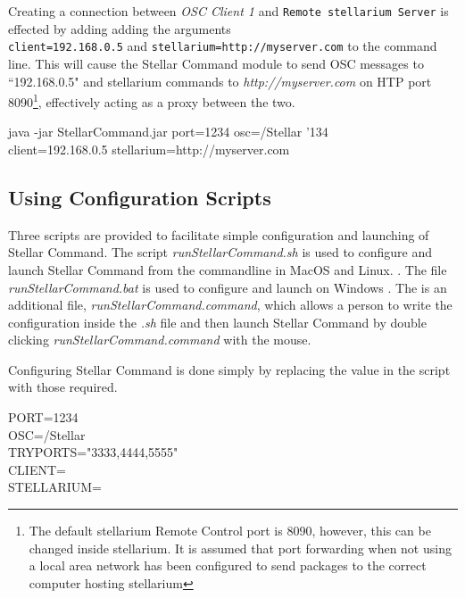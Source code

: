 Creating a connection between \textit{OSC Client 1} and \texttt{Remote stellarium Server} is effected by adding adding the arguments \\\texttt{client=192.168.0.5} and \texttt{stellarium=http://myserver.com} to the command line.
This will cause the Stellar Command module to send OSC messages to ``192.168.0.5" and stellarium commands to \textit{http://myserver.com} on HTP port 8090\footnote{The default stellarium Remote Control port is 8090, however, this can be changed inside stellarium. It is assumed that port forwarding when not using a local area network has been configured to send packages to the correct computer hosting stellarium}, effectively acting as a proxy between the two.

 \begin{syntax} 
	\medskip
	java -jar StellarCommand.jar port=1234 osc=/Stellar  {\char'134}\\client=192.168.0.5 stellarium=http://myserver.com\\
	\medskip
\end{syntax}
\bigskip

\subsection{Using Configuration Scripts}\label{sec:configscript}
Three scripts are provided to facilitate simple configuration and launching of  Stellar Command. The script \textit{runStellarCommand.sh} is used to configure and launch Stellar Command from the commandline in MacOS and Linux.   . The file \textit{runStellarCommand.bat} is used to configure and launch on Windows  . The is an additional file, \textit{runStellarCommand.command}, which allows a person to write the configuration inside the \textit{.sh} file and then launch Stellar Command by double clicking \textit{runStellarCommand.command} with the mouse.

Configuring Stellar Command is done simply by replacing the value in the script with those required.
 \begin{syntax} 
	\medskip
PORT=1234\\
OSC=/Stellar\\
TRYPORTS="3333,4444,5555"\\
CLIENT=\\
STELLARIUM=\\ 
	\medskip
\end{syntax}
\bigskip

